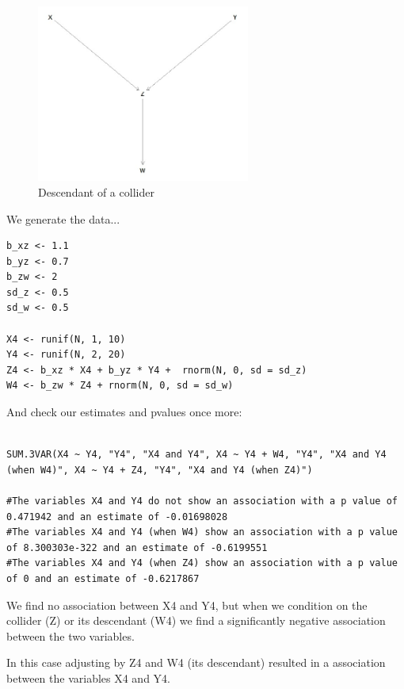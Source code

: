 \documentclass{article}
\begin{document}
\begin{figure}[h]
\caption{Descendant of a collider}
\includegraphics[width=7cm]{DAG_DESCENDANT.png}
\centering
\end{figure}

We generate the data...\par

\begin{lstlisting}
b_xz <- 1.1
b_yz <- 0.7
b_zw <- 2
sd_z <- 0.5
sd_w <- 0.5

X4 <- runif(N, 1, 10)
Y4 <- runif(N, 2, 20)
Z4 <- b_xz * X4 + b_yz * Y4 +  rnorm(N, 0, sd = sd_z)
W4 <- b_zw * Z4 + rnorm(N, 0, sd = sd_w)

\end{lstlisting}

And check our estimates and pvalues once more:\par

\begin{lstlisting}

SUM.3VAR(X4 ~ Y4, "Y4", "X4 and Y4", X4 ~ Y4 + W4, "Y4", "X4 and Y4 (when W4)", X4 ~ Y4 + Z4, "Y4", "X4 and Y4 (when Z4)")

#The variables X4 and Y4 do not show an association with a p value of 0.471942 and an estimate of -0.01698028 
#The variables X4 and Y4 (when W4) show an association with a p value of 8.300303e-322 and an estimate of -0.6199551 
#The variables X4 and Y4 (when Z4) show an association with a p value of 0 and an estimate of -0.6217867 
\end{lstlisting}

We find no association between X4 and Y4, but when we condition on the collider (Z) or its descendant (W4) we find a significantly negative association between the two variables. \par
In this case adjusting by Z4 and W4 (its descendant) resulted in a association between the variables X4 and Y4. \par
\end{document}
